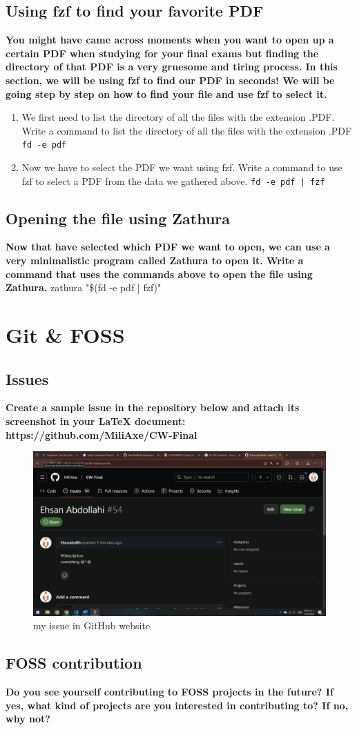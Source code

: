 \documentclass{article}
\begin{document}
    \subsection{Using fzf to find your favorite PDF}
    \textbf{You might have came across moments when you want to open up a certain PDF when studying for your final exams but finding the directory of that PDF is a very gruesome and tiring process. In this section, we will be using fzf to find our PDF in seconds! We will be going step by step on how to find your file and use fzf to select it.}
    \begin{enumerate}
        \item We first need to list the directory of all the files with the extension .PDF. Write a command to list the directory of all the files with the extension .PDF
        \textcolor{mygreen}{\texttt{fd -e pdf}}
        \item Now we have to select the PDF we want using fzf. Write a command to use fzf to select a PDF from the data we gathered above.
        \textcolor{mygreen}{\texttt{fd -e pdf | fzf}}
    \end{enumerate}
    
    \subsection{Opening the file using Zathura}
    \textbf{Now that have selected which PDF we want to open, we can use a very minimalistic program called Zathura to open it. Write a command that uses the commands above to open the file using Zathura.}
    {\color{mygreen}
        zathura "\$(fd -e pdf | fzf)"}
    \color{black}

    \section{Git \& FOSS}
    \subsection{Issues}
    \textbf{Create a sample issue in the repository below and attach its screenshot in your LaTeX document: https://github.com/MiliAxe/CW-Final}
    \begin{figure}[h]
        \centering
        \includegraphics[width=1\textwidth]{Screenshot.png}
        \caption{my issue in GitHub website}
        \label{fig:my_image}
    \end{figure}
    \subsection{FOSS contribution}
    \textbf{Do you see yourself contributing to FOSS projects in the future? If yes, what kind of projects are you interested in contributing to? If no, why not?}
\end{document}
